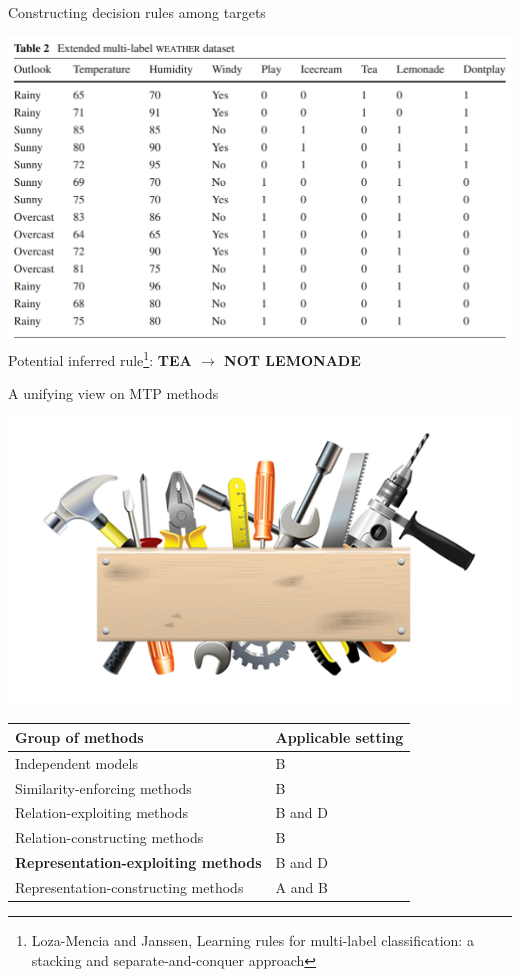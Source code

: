 \documentclass[]{beamer}
\renewcommand{\alert}[1]{\textbf{\color{putblue} #1}}
\begin{document}
\begin{frame}{Constructing decision rules among targets}
\begin{center}
\includegraphics[scale=0.3]{Figures/rules} \\ \pause 
Potential inferred rule\footnote{Loza-Mencia and Janssen, Learning rules for multi-label classification: a stacking and separate-and-conquer approach}: \alert{TEA $\rightarrow$ NOT LEMONADE} \\

\vspace{0.3cm}
\end{center}

\end{frame}


\begin{frame}{A unifying view on MTP methods}

\begin{center}
\includegraphics[scale=0.3]{pics/tools}

\begin{tabular}{ll}
\hline
Group of methods & Applicable setting \\
\hline
\hline
Independent models & B \\
Similarity-enforcing methods & B   \\ 
Relation-exploiting methods & B and D  \\
Relation-constructing methods & B \\
\alert{Representation-exploiting methods} & B and D \\
Representation-constructing methods & A and B \\
\hline  
\end{tabular}
\end{center}
\end{frame}
\end{document}
